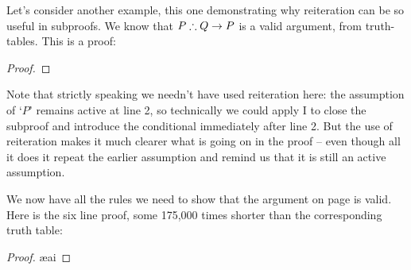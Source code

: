 Let's consider another example, this one demonstrating why reiteration can be so useful in subproofs. We know that $P \mathrel{\therefore} Q \rightarrow P$ is a valid argument, from truth-tables. This is a proof: \begin{proof}
	\open
	\close
\end{proof} Note that strictly speaking we needn't have used reiteration here: the assumption of `$P$' remains active at line 2, so technically we could apply {\eif}I to close the subproof and introduce the conditional immediately after line 2. But the use of reiteration makes it much clearer what is going on in the proof – even though all it does it repeat the earlier assumption and remind us that it is still an active assumption. 


We now have all the rules we need to show that the argument on page \pageref{longtt} is valid. Here is the six line proof,  some 175,000 times shorter  than the corresponding truth table:\label{ndshort}

\hspace{-2.25cm}\begin{minipage}{\textwidth}\footnotesize\begin{proof}
	\open
		\ae{ai}
		\close
\end{proof}\end{minipage}



